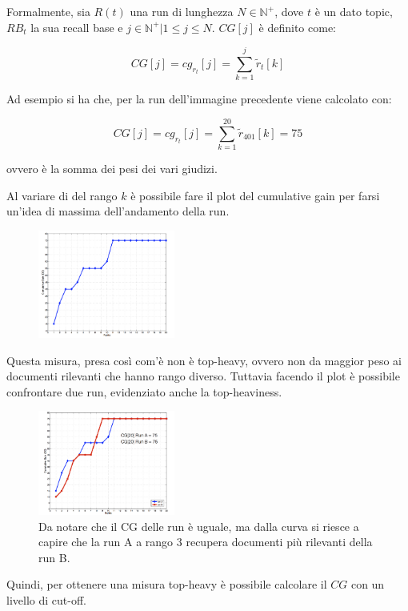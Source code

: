 \noindent Formalmente, sia $R(t)$ una run di lunghezza $N \in \mathbb{N}^+$, dove $t$ è un dato topic, $RB_t$ la sua recall base e $j \in \mathbb{N}^+ | 1 \leq j \leq N$. $CG[j]$ è definito come:

$$
CG[j] = cg_{r_t}[j] = \sum\limits_{k=1}^j \tilde{r}_t[k]
$$

\noindent Ad esempio si ha che, per la run dell'immagine precedente viene calcolato con:

$$
CG[j] = cg_{r_t}[j] = \sum\limits_{k=1}^{20} \tilde{r}_{401}[k] = 75
$$

\noindent ovvero è la somma dei pesi dei vari giudizi.

Al variare di del rango $k$ è possibile fare il plot del cumulative gain per farsi un'idea di massima dell'andamento della run.

\begin{figure}
	\centering
	\includegraphics[width=0.4\textwidth]{images/l16-fig-2.png}
\end{figure}

Questa misura, presa così com'è non è top-heavy, ovvero non da maggior peso ai documenti rilevanti che hanno rango diverso. Tuttavia facendo il plot è possibile confrontare due run, evidenziato anche la top-heaviness.

\begin{figure}
	\centering
	\includegraphics[width=0.4\textwidth]{images/l16-fig-3.png}
	\caption{Da notare che il CG delle run è uguale, ma dalla curva si riesce a capire che la run A a rango 3 recupera documenti più rilevanti della run B.}
\end{figure}

Quindi, per ottenere una misura top-heavy è possibile calcolare il $CG$ con un livello di cut-off.

